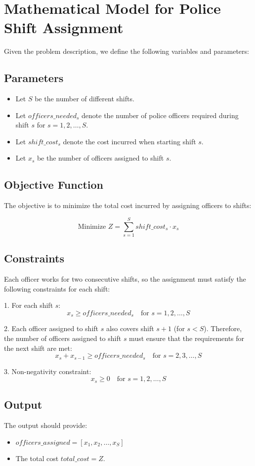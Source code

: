 \documentclass{article}
\begin{document}
\section*{Mathematical Model for Police Shift Assignment}

Given the problem description, we define the following variables and parameters:

\subsection*{Parameters}
\begin{itemize}
    \item Let \( S \) be the number of different shifts.
    \item Let \( officers\_needed_s \) denote the number of police officers required during shift \( s \) for \( s = 1, 2, \ldots, S \).
    \item Let \( shift\_cost_s \) denote the cost incurred when starting shift \( s \).
    \item Let \( x_s \) be the number of officers assigned to shift \( s \).
\end{itemize}

\subsection*{Objective Function}
The objective is to minimize the total cost incurred by assigning officers to shifts:

\[
\text{Minimize } Z = \sum_{s=1}^{S} shift\_cost_s \cdot x_s
\]

\subsection*{Constraints}
Each officer works for two consecutive shifts, so the assignment must satisfy the following constraints for each shift:

1. For each shift \( s \):
   \[
   x_s \geq officers\_needed_s \quad \text{for } s = 1, 2, \ldots, S
   \]

2. Each officer assigned to shift \( s \) also covers shift \( s+1 \) (for \( s < S \)). Therefore, the number of officers assigned to shift \( s \) must ensure that the requirements for the next shift are met:
   \[
   x_s + x_{s-1} \geq officers\_needed_s \quad \text{for } s = 2, 3, \ldots, S
   \]

3. Non-negativity constraint:
   \[
   x_s \geq 0 \quad \text{for } s = 1, 2, \ldots, S
   \]

\subsection*{Output}
The output should provide:
\begin{itemize}
    \item \( officers\_assigned = [x_1, x_2, \ldots, x_S] \)
    \item The total cost \( total\_cost = Z \).
\end{itemize}
\end{document}
